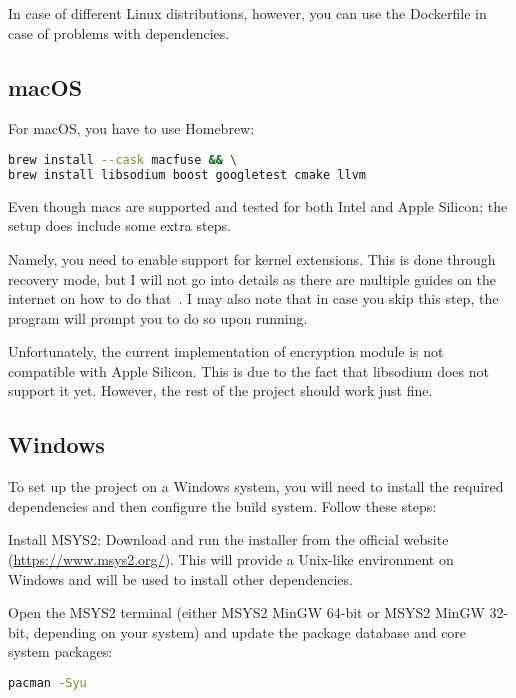 In case of different Linux distributions, however, you can use the Dockerfile in case of problems with dependencies.

\subsection*{macOS}

For macOS, you have to use Homebrew:

\begin{lstlisting}[language=bash, basicstyle=\ttfamily\small]
brew install --cask macfuse && \
brew install libsodium boost googletest cmake llvm
\end{lstlisting}

Even though macs are supported and tested for both Intel and Apple Silicon; the setup does include some extra steps.

Namely, you need to enable support for kernel extensions.
This is done through recovery mode, but I will not go into details as there are multiple guides on the internet on how to do that~\cite{macos-kext}.
I may also note that in case you skip this step, the program will prompt you to do so upon running.

Unfortunately, the current implementation of encryption module is not compatible with Apple Silicon.
This is due to the fact that libsodium does not support it yet.
However, the rest of the project should work just fine.

\subsection*{Windows}


To set up the project on a Windows system, you will need to install the required dependencies and then configure the build system.
Follow these steps:

Install MSYS2: Download and run the installer from the official website (\url{https://www.msys2.org/}). This will provide a Unix-like environment on Windows and will be used to install other dependencies.

Open the MSYS2 terminal (either MSYS2 MinGW 64-bit or MSYS2 MinGW 32-bit, depending on your system) and update the package database and core system packages:

\begin{lstlisting}[language=bash, basicstyle=\ttfamily\small]
pacman -Syu
\end{lstlisting}


